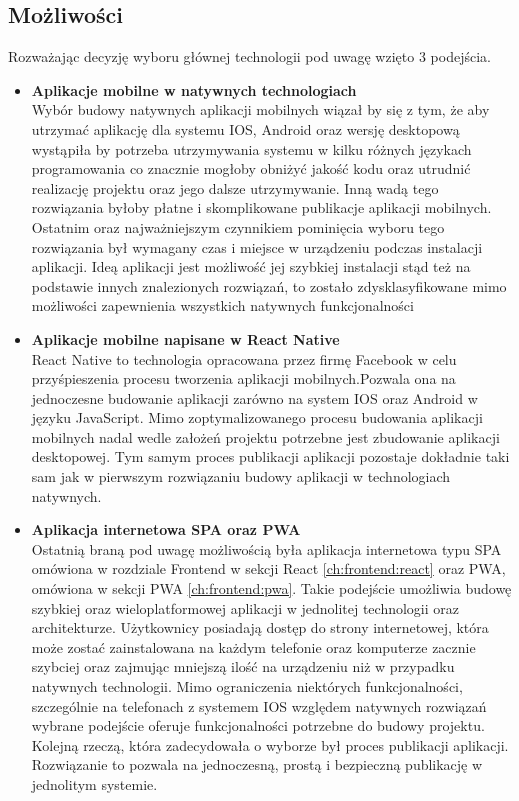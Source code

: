 \subsection{Możliwości}
Rozważając decyzję wyboru głównej technologii pod uwagę wzięto 3 podejścia.
\begin{itemize}
    \item \textbf {Aplikacje mobilne w natywnych technologiach} \\
        Wybór budowy natywnych aplikacji mobilnych wiązał by się z tym, że aby utrzymać aplikację dla systemu IOS, Android oraz wersję desktopową wystąpiła by potrzeba utrzymywania systemu w kilku różnych językach programowania co znacznie mogłoby obniżyć jakość kodu oraz utrudnić realizację projektu oraz jego dalsze utrzymywanie. Inną wadą tego rozwiązania byłoby płatne i skomplikowane publikacje aplikacji mobilnych. Ostatnim oraz najważniejszym czynnikiem pominięcia wyboru tego rozwiązania był wymagany czas i miejsce w urządzeniu podczas instalacji aplikacji. Ideą aplikacji jest możliwość jej szybkiej instalacji stąd też na podstawie innych znalezionych rozwiązań, to zostało zdysklasyfikowane mimo możliwości zapewnienia wszystkich natywnych funkcjonalności

    \item \textbf {Aplikacje mobilne napisane w React Native} \\
        React Native to technologia opracowana przez firmę Facebook w celu przyśpieszenia procesu tworzenia aplikacji mobilnych.Pozwala ona na jednoczesne budowanie aplikacji zarówno na system IOS oraz Android w języku JavaScript. Mimo zoptymalizowanego procesu budowania aplikacji mobilnych nadal wedle założeń projektu potrzebne jest zbudowanie aplikacji desktopowej. Tym samym proces publikacji aplikacji pozostaje dokładnie taki sam jak w pierwszym rozwiązaniu budowy aplikacji w technologiach natywnych.

    \item \textbf {Aplikacja internetowa SPA oraz PWA} \\
        Ostatnią braną pod uwagę możliwością była aplikacja internetowa typu SPA omówiona w rozdziale Frontend w sekcji React \ref{ch:frontend:react} oraz PWA, omówiona w sekcji PWA \ref{ch:frontend:pwa}. Takie podejście umożliwia budowę szybkiej oraz wieloplatformowej aplikacji w jednolitej technologii oraz architekturze. Użytkownicy posiadają dostęp do strony internetowej, która może zostać zainstalowana na każdym telefonie oraz komputerze zacznie szybciej oraz zajmując mniejszą ilość na urządzeniu niż w przypadku natywnych technologii. Mimo ograniczenia niektórych funkcjonalności, szczególnie na telefonach z systemem IOS względem natywnych rozwiązań wybrane podejście oferuje funkcjonalności potrzebne do budowy projektu. Kolejną rzeczą, która zadecydowała o wyborze był proces publikacji aplikacji. Rozwiązanie to pozwala na jednoczesną, prostą i bezpieczną publikację w jednolitym systemie.
\end{itemize}

